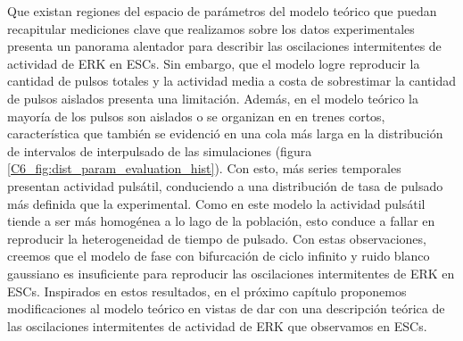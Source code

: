 \documentclass[./main.tex]{subfiles}
\begin{document}
Que existan regiones del espacio de parámetros del modelo teórico que puedan recapitular mediciones clave que realizamos sobre los datos experimentales presenta un panorama alentador para describir las oscilaciones intermitentes de actividad de ERK en ESCs. Sin embargo, que el modelo logre reproducir la cantidad de pulsos totales y la actividad media a costa de sobrestimar la cantidad de pulsos aislados presenta una limitación. Además, en el modelo teórico la mayoría de los pulsos son aislados o se organizan en en trenes cortos, característica que también se evidenció en una cola más larga en la distribución de intervalos de interpulsado de las simulaciones (figura \ref{C6_fig:dist_param_evaluation_hist}). Con esto, más series temporales presentan actividad pulsátil, conduciendo a una distribución de tasa de pulsado más definida que la experimental. Como en este modelo la actividad pulsátil tiende a ser más homogénea a lo lago de la población, esto conduce a fallar en reproducir la heterogeneidad de tiempo de pulsado. Con estas observaciones, creemos que el modelo de fase con bifurcación de ciclo infinito y ruido blanco gaussiano es insuficiente para reproducir las oscilaciones intermitentes de ERK en ESCs. Inspirados en estos resultados, en el próximo capítulo proponemos modificaciones al modelo teórico en vistas de dar con una descripción teórica de las oscilaciones intermitentes de actividad de ERK que observamos en ESCs.

\end{document}
